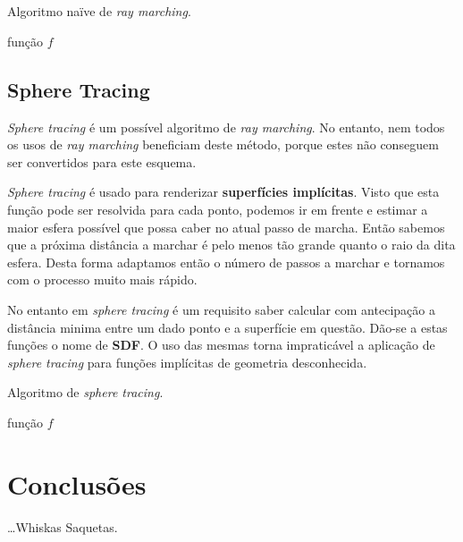 \\
\\

\begin{algorithm}[!htbp]
	\caption{Algoritmo naïve de \textit{ray marching}.}
	\label{alg::raymarch_naive}
	\begin{algorithmic}
\Require função $f$      
	\end{algorithmic}
\end{algorithm}


\subsection{Sphere Tracing}
\label{ssec::arte:raymarch:spheretracing}


\textit{Sphere tracing} é um possível algoritmo de \textit{ray marching}. No entanto, nem todos os usos de \textit{ray marching} beneficiam deste método, porque estes não conseguem ser convertidos para este esquema.

\textit{Sphere tracing} é usado para renderizar \textbf{superfícies implícitas}. Visto que esta função pode ser resolvida para cada ponto, podemos ir em frente e estimar a maior esfera possível que possa caber no atual passo de marcha. Então sabemos que a próxima distância a marchar é pelo menos tão grande quanto o raio da dita esfera. Desta forma adaptamos então o número de passos a marchar e tornamos com o processo muito mais rápido.


No entanto em \textit{sphere tracing} é um requisito saber calcular com antecipação a distância minima entre um dado ponto e a superfície em questão. Dão-se a estas funções o nome de \textbf{\ac{SDF}}. O uso das mesmas torna impraticável a aplicação de \textit{sphere tracing} para funções implícitas de geometria desconhecida.


\begin{algorithm}[!htbp]
	\caption{Algoritmo de \textit{sphere tracing}.}
	\label{alg::raymarch_spheretrace}
	\begin{algorithmic}
\Require função $f$      
	\end{algorithmic}
\end{algorithm}


\section{\opengl}
\label{sec::arte:opengl}



\section{Conclusões}
\label{sec::arte:conc}

\ldots Whiskas Saquetas.
